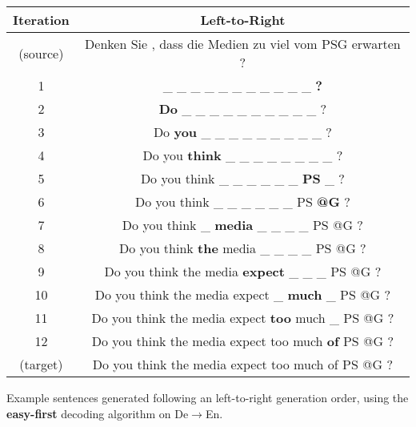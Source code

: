 \centering
\footnotesize
\begin{tabular}{cc}
\toprule
Iteration & {\color{red} Left-to-Right} \\
\midrule
(source) & Denken Sie , dass die Medien zu viel vom PSG erwarten ? \\
1 &  \_ \_ \_ \_ \_ \_ \_ \_ \_ \_ \_ \textbf{?} \\ 
2 & \textbf{Do} \_ \_ \_ \_ \_ \_ \_ \_ \_ \_ ? \\
3 &  Do \textbf{you} \_ \_ \_ \_ \_ \_ \_ \_ \_ ? \\
4 &  Do you \textbf{think} \_ \_ \_ \_ \_ \_ \_ \_ ? \\
5 &  Do you think \_ \_ \_ \_ \_ \_ \textbf{PS} \_ ? \\
6 &  Do you think \_ \_ \_ \_ \_ \_ PS \textbf{@G} ? \\
7 &  Do you think \_ \textbf{media} \_ \_ \_ \_ PS @G ? \\
8 &  Do you think \textbf{the} media \_ \_ \_ \_ PS @G ? \\
9 &  Do you think the media \textbf{expect} \_ \_ \_ PS @G ? \\
10 & Do you think the media expect \_ \textbf{much} \_ PS @G ? \\
11 & Do you think the media expect \textbf{too} much \_ PS @G ? \\
12 & Do you think the media expect too much \textbf{of} PS @G ? \\

(target) & Do you think the media expect too much of PS @G ? \\

\bottomrule
\end{tabular}

\caption{Example sentences generated following an {\color{red} left-to-right} generation order, using the \textbf{easy-first} decoding algorithm on De$\rightarrow$En.}